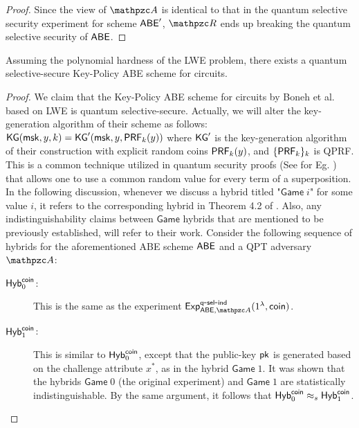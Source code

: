 \begin{proof}
Since the view of $\qA$ is identical to that in the
quantum selective security experiment for scheme $\mathsf{ABE}'$, $\qR$ ends
up breaking the quantum selective security of $\mathsf{ABE}$.
\end{proof}


\begin{theorem}
Assuming the polynomial hardness of the
LWE problem, there exists a quantum selective-secure
Key-Policy ABE scheme for circuits.
\end{theorem}
\begin{proof}
We claim that the Key-Policy ABE scheme for circuits by Boneh et al.
\cite{EC:BGGHNS14} based on LWE is quantum selective-secure.
Actually, we will alter the key-generation algorithm of their scheme
as follows: $\mathsf{KG}(\mathsf{msk}, y, k) = \mathsf{KG}'(\mathsf{msk}, y, \mathsf{PRF}_k(y))$ where
$\mathsf{KG}'$ is the key-generation algorithm of their construction with
explicit random coins $\mathsf{PRF}_k(y)$, and $\{\mathsf{PRF}_k\}_k$ is QPRF.
This is a common technique utilized in quantum security proofs (See
for Eg. \cite{EC:BonZha13,C:BonZha13}) that allows one to use a
common random value for every term of a superposition. In the
following discussion, whenever we discuss a hybrid titled
"$\mathsf{Game}\;i$" for some value $i$, it refers to the
corresponding hybrid in Theorem 4.2 of \cite{EC:BGGHNS14}. Also, any
indistinguishability claims between $\mathsf{Game}$ hybrids that are
mentioned to be previously established, will refer to their work.
Consider the following sequence of hybrids for the aforementioned
ABE scheme $\mathsf{ABE}$ and a QPT adversary $\qA$:

\begin{description}
\item[$\mathsf{Hyb}_{0}^{\mathsf{coin}}$:] This is the same as the experiment
    $\expc{\ABE,\qA}{q}{sel}{ind}(1^\secp, \coin)$.



\item[$\mathsf{Hyb}_{1}^{\mathsf{coin}}$:] This is similar to $\mathsf{Hyb}_0^{\mathsf{coin}}$, except
that the public-key $\mathsf{pk}$ is generated based on the challenge
attribute $x^*$, as in the hybrid $\mathsf{Game}\;1$. It was shown
that the hybrids $\mathsf{Game}\;0$ (the original experiment) and
$\mathsf{Game}\;1$ are statistically indistinguishable. By the same
argument, it follows that $\mathsf{Hyb}_0^{\mathsf{coin}} \approx_s \mathsf{Hyb}_1^{\mathsf{coin}}$.


\end{description}
\end{proof}

